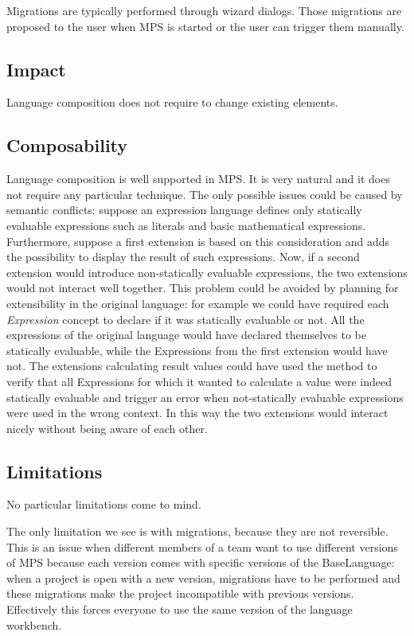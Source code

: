 \documentclass[preprint,numbers,10pt]{sigplanconf}
\begin{document}
Migrations are typically performed through wizard dialogs. Those migrations are proposed to the user when MPS is started or the user can trigger them manually.

\subsection{Impact}

Language composition does not require to change existing elements.

\subsection{Composability}

Language composition is well supported in MPS. It is very natural and it does not require any particular technique. The only possible issues could be caused by semantic conflicts: suppose an expression language defines only statically evaluable expressions such as literals and basic mathematical expressions. Furthermore, suppose a first extension is based on this consideration and adds the possibility to display the result of such expressions. Now, if a second extension would introduce non-statically evaluable expressions, the two extensions would not interact well together. This problem could be avoided by planning for extensibility in the original language: for example we could have required each \emph{Expression} concept to declare if it was statically evaluable or not. All the expressions of the original language would have declared themselves to be statically evaluable, while the Expressions from the first extension would have not. The extensions calculating result values could have used the method to verify that all Expressions for which it wanted to calculate a value were indeed statically evaluable and trigger an error when not-statically evaluable expressions were used in the wrong context. In this way the two extensions would interact nicely without being aware of each other.

\subsection{Limitations}

No particular limitations come to mind.

The only limitation we see is with migrations, because they are not reversible. This is an issue when different members of a team want to use different versions of MPS because each version comes with specific versions of the BaseLanguage: when a project is open with a new version, migrations have to be performed and these migrations make the project incompatible with previous versions. Effectively this forces everyone to use the same version of the language workbench.
\end{document}
